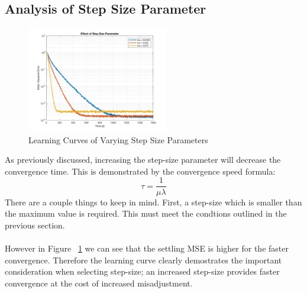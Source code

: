 \documentclass[journal]{IEEEtran}
\begin{document}
\subsection{Analysis of Step Size Parameter}
\vspace{-5mm}
\begin{figure}[H]
  \centering
  \captionsetup{justification=centering,font = small}
  \includegraphics[width=0.55\textwidth, inner] {Plots/Project1_Part4.jpg}
  \caption{Learning Curves of Varying Step Size Parameters}
    \label{fig:stepsize}
\end{figure}
As previously discussed, increasing the step-size parameter will decrease the
convergence time. This is demonstrated by the convergence speed formula:
$$ \tau = \dfrac{1}{\mu\lambda}$$ There are a couple things to keep in mind. First, a
step-size which is smaller than the maximum value is required. This must meet the condtions outlined in the previous section.
\\
\\
However in Figure ~\ref{fig:stepsize} we can see that the settling MSE is higher for the faster convergence. Therefore the learning curve
clearly demostrates the important consideration when selecting step-size; an increased step-size provides
faster convergence at the cost of increased misadjustment.
\end{document}
